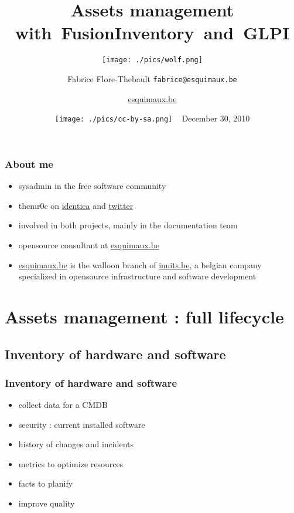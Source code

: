 \documentclass{beamer}
\title{Assets management with~FusionInventory~and~GLPI}
\date{\texttt{[image: ./pics/cc-by-sa.png]} ~ December 30, 2010}
\subtitle{\texttt{[image: ./pics/wolf.png]}}
\institute{\texttt{[image: ./pics/esquimaux-logo.png]}}
\author{ Fabrice Flore-Thebault \texttt{fabrice@esquimaux.be} }
\begin{document}
\frame[plain]{\titlepage}


\author{\href{http://esquimaux.be}{esquimaux.be}}

\begin{frame}

\frametitle{About me}

\begin{itemize}

\item sysadmin in the free software community
\item themr0c on \href{http://identi.ca/themr0c}{identica} and  \href{http://twitter.com/themr0c}{twitter}
\item involved in both projects, mainly in the documentation team 
\item opensource consultant at \href{http://esquimaux.be}{esquimaux.be}
\item \href{http://esquimaux.be}{esquimaux.be} is the walloon branch of \href{http://inuits.be}{inuits.be}, a belgian company specialized in opensource infrastructure and software development
\end{itemize}

\end{frame}

\section{Assets management : full lifecycle}
%
\subsection{Inventory of hardware and software}
\begin{frame}
\frametitle{Inventory of hardware and software}

\begin{itemize}
%
\item collect data for a CMDB
\item security : current installed software
\item history of changes and incidents
\item metrics to optimize resources
\item facts to planify
\item improve quality
%
\end{itemize}
\end{frame}
\end{document}
